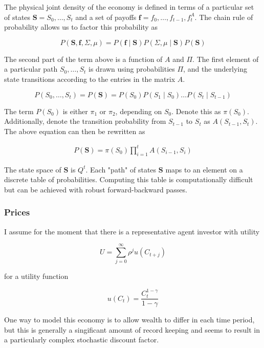 \documentclass{article}
\begin{document}
\newcommand{\Slist}{S_0, \dots, S_t}
\newcommand{\Flist}{f_0, \dots, f_{t-1}, f_{t}^A}
\newcommand{\States}{\mathbf{S}}
\newcommand{\Payoffs}{\mathbf{f}}

The physical joint density of the economy is defined in terms of a particular set of states $\States = \Slist$ and a set of payoffs $\Payoffs = \Flist$. The chain rule of probability allows us to factor this probability as

$$
P(\States, \Payoffs, \Sigma, \mu) = P(\Payoffs \mid \States) P(\Sigma, \mu \mid \States) P(\States)
$$

The second part of the term above is a function of $A$ and $\Pi$. The first element of a particular path $\Slist$ is drawn using probabilities $\Pi$, and the underlying state transitions according to the entries in the matrix $A$. 

$$
P(\Slist) = P(\States) = P(S_0)P(S_1 \mid S_0) \dots P(S_t \mid S_{t-1})
$$

The term $P(S_0)$ is either $\pi_1$ or $\pi_2$, depending on $S_0$. Denote this as $\pi(S_0)$. Additionally, denote the transition probability from $S_{t-1}$ to $S_t$ as $A(S_{t-1}, S_t)$. The above equation can then be rewritten as

\begin{align*}
    P(\States) = \pi(S_0) \prod_{i=1}^t A(S_{i-1}, S_{i})
\end{align*}

The state space of $\States$ is $Q^t$. Each "path" of states $\States$ maps to an element on a discrete table of probabilities. Computing this table is computationally difficult but can be achieved with robust forward-backward passes.

\subsubsection*{Prices}

I assume for the moment that there is a representative agent investor with utility

\newcommand{\U}{\sum_{j=0}^\infty \rho^j u(C_{t+j})}
$$
U = \U
$$

\noindent for a utility function 

$$
u(C_t) = \frac{C_t^{1-\gamma}}{1 - \gamma}
$$

One way to model this economy is to allow wealth to differ in each time period, but this is generally a singificant amount of record keeping and seems to result in a particularly complex stochastic discount factor. 
\end{document}
